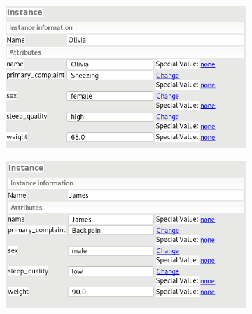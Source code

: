\documentclass[a4paper]{article}
\begin{document}
\begin{enumerate}[label=\alph*)]
            \begin{figure}[H]
                \centering
                \hfill
                \begin{subfigure}{.47\itemizewidth}%
                    \includegraphics[width=\linewidth]{olivia.png}
                \end{subfigure}
                \hspace{0.05\itemizewidth}
                \begin{subfigure}{.47\itemizewidth}%
                    \includegraphics[width=\linewidth]{james.png}
                \end{subfigure}

                \vspace{5mm}


\end{figure}
\end{enumerate}
\end{document}
